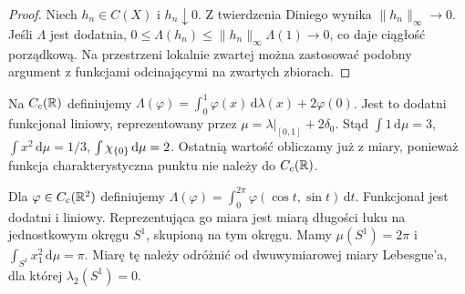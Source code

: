 \begin{proof}
Niech $h_n\in C(X)$ i $h_n\downarrow0$. Z twierdzenia Diniego wynika $\|h_n\|_\infty\to0$. Jeśli $\Lambda$ jest dodatnia, $0\le\Lambda(h_n)\le\|h_n\|_\infty\Lambda(1)\to0$, co daje ciągłość porządkową. Na przestrzeni lokalnie zwartej można zastosować podobny argument z funkcjami odcinającymi na zwartych zbiorach.
\end{proof}
\begin{przyklad}
Na $C_c(\mathbb R)$ definiujemy $\Lambda(\varphi)=\int_0^1\varphi(x)\,\mathrm d\lambda(x)+2\varphi(0)$. Jest to dodatni funkcjonał liniowy, reprezentowany przez $\mu=\lambda|_{[0,1]}+2\delta_0$. Stąd $\int 1\,\mathrm d\mu=3$, $\int x^2\,\mathrm d\mu=1/3$, $\int\chi_{\{0\}}\,\mathrm d\mu=2$. Ostatnią wartość obliczamy już z miary, ponieważ funkcja charakterystyczna punktu nie należy do $C_c(\mathbb R)$.
\end{przyklad}
\begin{przyklad}
Dla $\varphi\in C_c(\mathbb R^2)$ definiujemy $\Lambda(\varphi)=\int_0^{2\pi}\varphi(\cos t,\sin t)\,\mathrm dt$. Funkcjonał jest dodatni i liniowy. Reprezentująca go miara jest miarą długości łuku na jednostkowym okręgu $S^1$, skupioną na tym okręgu. Mamy $\mu(S^1)=2\pi$ i $\int_{S^1}x_1^2\,\mathrm d\mu=\pi$. Miarę tę należy odróżnić od dwuwymiarowej miary Lebesgue'a, dla której $\lambda_2(S^1)=0$.
\end{przyklad}

